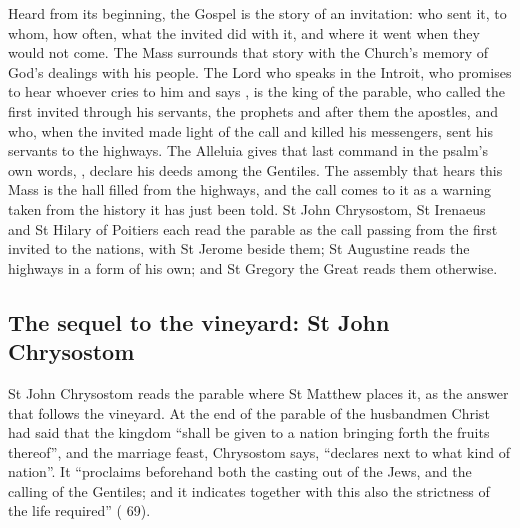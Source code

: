 \label{sec:call-to-the-nations}

Heard from its beginning, the Gospel is the story of an invitation: who sent
it, to whom, how often, what the invited did with it, and where it went when
they would not come. The Mass surrounds that story with the Church's memory of
God's dealings with his people. The Lord who speaks in the Introit, who
promises to hear whoever cries to him and says , is the king of the parable, who called the first invited through his servants,
the prophets and after them the apostles, and who, when the invited made light
of the call and killed his messengers, sent his servants to the highways. The
Alleluia gives that last command in the psalm's own words, , declare his deeds among the Gentiles. The assembly
that hears this Mass is the hall filled from the highways, and the call comes to
it as a warning taken from the history it has just been told. St John
Chrysostom, St Irenaeus and St Hilary of Poitiers each read the parable as the
call passing from the first invited to the nations, with St Jerome beside them;
St Augustine reads the highways in a form of his own; and St Gregory the Great
reads them otherwise.

\subsection{The sequel to the vineyard: St John Chrysostom}

St John Chrysostom reads the parable where St Matthew places it, as the answer
that follows the vineyard. At the end of the parable of the husbandmen Christ
had said that the kingdom ``shall be given to a nation bringing forth the
fruits thereof'', and the marriage feast, Chrysostom says, ``declares next to
what kind of nation''. It ``proclaims beforehand both the casting out of the
Jews, and the calling of the Gentiles; and it indicates together with this also
the strictness of the life required'' ( 69).

